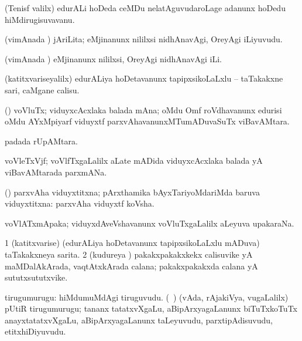 \bentry 
{} 
\gl{\nA}
\expl{}
\bmng
 (Tenisf \mo valilx) edurALi hoDeda ceMDu nelatAguvudaroLage adanunx hoDedu hiMdirugisuvavanu. 
\emng
\eentry

\bentry 
{} 
\gl{\akirx}
\expl{}
\bmng
 (vimAnada \vi) jAriLita; eMjinanunx nililxsi nidhAnavAgi, OreyAgi iLiyuvudu. 
\emng
\eentry

\bentry 
{} 
\gl{\akirx}
\expl{}
\bmng
 (vimAnada \vi) eMjinanunx nililxsi, OreyAgi nidhAnavAgi iLi. 
\emng
\eentry

\bentry
{}
\gl{\saMkiSx}
\expl{}
\bmng
\emng
\eentry

\bentry 
{} 
\gl{\akirx}
\expl{}
\bmng
 (katitxvariseyalilx) edurALiya hoDetavanunx tapipxsikoLaLxlu -- taTakakxne sari, caMgane calisu. 
\emng
\eentry

\bentry
{} 
\gl{\nA}
\expl{}
\bmng
 (\viduyx) voVluTx; viduyxcAcxlaka balada mAna; oMdu Omf roVdhavanunx edurisi oMdu AYxMpiyarf viduyxtf parxvAhavanunxMTumADuvaSuTx viBavAMtara. 
\emng
\eentry

\bentry 
{} 
\gl{\nA}
\expl{}
\bmng
  padada rUpAMtara. 
\emng
\eentry

\bentry
{} 
\gl{\nA}
\expl{}
\bmng
 voVleTxVjf; voVlfTxgaLalilx aLate mADida viduyxcAcxlaka balada yA viBavAMtarada parxmANa. 
\emng
\eentry

\bentry 
{} 
\gl{\gu}
\expl{}
\bmng
 (\pArxparx) parxvAha viduyxtitxna; pArxthamika bAyxTariyoMdariMda baruva viduyxtitxna:  parxvAha viduyxtf koVsha. 
\emng
\eentry

\bentry 
{} 
\gl{\nA}
\expl{}
\bmng
 voVlATxmApaka; viduyxdAveVshavanunx voVluTxgaLalilx aLeyuva upakaraNa. 
\emng
\eentry

\bentry 
{} 
\gl{\nA}
\expl{}
\bmng
\bnum
\num{1} (katitxvarise) (edurALiya hoDetavanunx tapipxsikoLaLxlu mADuva) taTakakxneya sarita. 
\num{2} (kudureya \vi) pakakxpakakxkekx calisuvike yA maMDalAkArada, vaqtAtxkArada calana; pakakxpakakxda calana yA sututxsututxvike. 
\enum
\emng
\eentry

\bentry 
{} 
\gl{\nA}
\expl{}
\bmng
tirugumurugu: 
\banum
{} hiMdumuMdAgi tiruguvudu. 
 (\kanmu\ \rUpa) (vAda, rAjakiVya, \mo vugaLalilx) pUtiR tirugumurugu; tananx tatatxvXgaLu, aBipArxyagaLanunx biTuTxkoTuTx anayxtatatxvXgaLu, aBipArxyagaLanunx taLeyuvudu, parxtipAdisuvudu, etitxhiDiyuvudu. 
\eanum
\emng
\eentry


